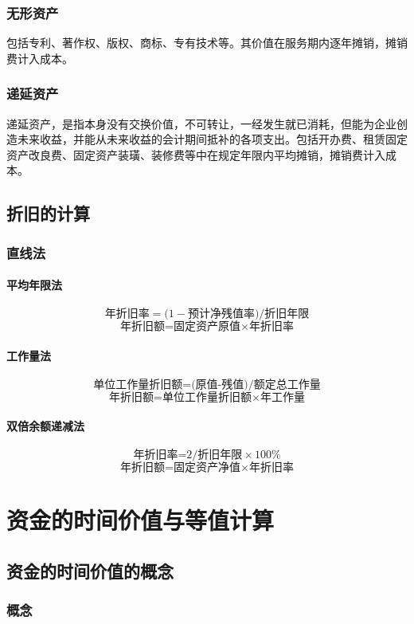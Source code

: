 \documentclass[12pt, a4paper, oneside]{ctexbook}
\begin{document}
\subsection{无形资产}
包括专利、著作权、版权、商标、专有技术等。其价值在服务期内逐年摊销，摊销费计入成本。

\subsection{递延资产}
递延资产，是指本身没有交换价值，不可转让，一经发生就已消耗，但能为企业创造未来收益，并能从未来收益的会计期间抵补的各项支出。包括开办费、租赁固定资产改良费、固定资产装璜、装修费等中在规定年限内平均摊销，摊销费计入成本。

\section{折旧的计算}
\subsection{直线法}
\subsubsection{平均年限法}
$$\mbox{年折旧率}=(1-\mbox{预计净残值率)/折旧年限}$$
$$\mbox{年折旧额=固定资产原值} \times \mbox{年折旧率}$$

\subsubsection{工作量法}
$$\mbox{单位工作量折旧额=(原值-残值)/额定总工作量}$$
$$\mbox{年折旧额=单位工作量折旧额} \times \mbox{年工作量}$$

\subsubsection{双倍余额递减法}
$$\mbox{年折旧率=}2/\mbox{折旧年限} \times 100\%$$
$$\mbox{年折旧额=固定资产净值} \times \mbox{年折旧率}$$

\chapter{资金的时间价值与等值计算}

\section{资金的时间价值的概念}

\subsection{概念}
\end{document}
